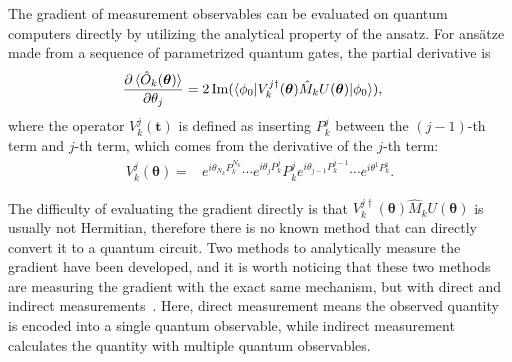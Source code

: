 The gradient of measurement observables can be evaluated on quantum computers directly by utilizing the analytical property of the ansatz. For ans{\"{a}}tze made from a sequence of parametrized quantum gates, the partial derivative is
\begin{align}\label{eq:exactDerivative}
\frac{\partial \braket{\hat{O}_k(\boldsymbol{\theta})}}{\partial \theta_j} &= 
2 \operatorname{Im} (\langle \phi_0| V^{j\dagger}_{k}(\boldsymbol{\theta}) \hat{M}_k U(\boldsymbol{\theta})|\phi_0\rangle),
\end{align}
where the operator $V^{j}_{k}(\mathbf{t})$ is defined as inserting $P^j_k$ between the $(j-1)$-th term and $j$-th term, which comes from the derivative of the $j$-th term:
\begin{align}
V^{j}_{k}(\boldsymbol{\theta}) = & e^{i \theta_{N_k} P^{N_k}_k} \cdots e^{i \theta_{j} P^{j}_{k}} P^j_{k} e^{i \theta_{j-1} P^{j-1}_{k}} \cdots  e^{i \theta^{1} P^{1}_{k}}.
\end{align}

The difficulty of evaluating the gradient directly is that $V^{j\dagger}_{k}(\boldsymbol{\theta}) \hat{M}_k U(\boldsymbol{\theta})$ is usually not Hermitian, therefore there is no known method that can directly convert it to a quantum circuit. Two methods to analytically measure the gradient have been developed, and it is worth noticing that these two methods are measuring the gradient with the exact same mechanism, but with direct and indirect measurements~\cite{mitarai_methodology_2019}. Here, direct measurement means the observed quantity is encoded into a single quantum observable, while indirect measurement calculates the quantity with multiple quantum observables. 


